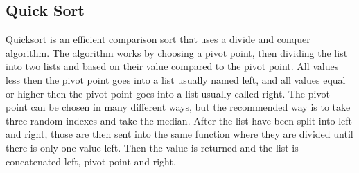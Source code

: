 \subsection{Quick Sort}
Quicksort is an efficient comparison sort that uses a divide and conquer algorithm. The algorithm works by choosing a pivot point, then dividing the list into two lists and based on their value compared to the pivot point. All values less then the pivot point goes into a list usually named left, and all values equal or higher then the pivot point goes into a list usually called right. The pivot point can be chosen in many different ways, but the recommended way is to take three random indexes and take the median. After the list have been split into left and right, those are then sent into the same function where they are divided until there is only one value left. Then the value is returned and the list is concatenated left, pivot point and right.